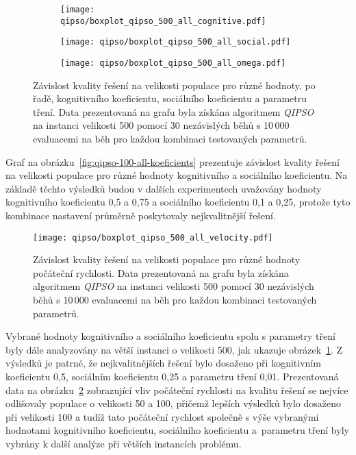 \begin{figure}[ht!]
    \centering
    \begin{subfigure}[b]{0.48\textwidth}
        \centering
        \texttt{[image: qipso/boxplot\_qipso\_500\_all\_cognitive.pdf]}
    \end{subfigure}
    \hfill
    \begin{subfigure}[b]{0.48\textwidth}
        \centering
        \texttt{[image: qipso/boxplot\_qipso\_500\_all\_social.pdf]}
    \end{subfigure}

    \begin{subfigure}[b]{0.48\textwidth}
        \centering
        \texttt{[image: qipso/boxplot\_qipso\_500\_all\_omega.pdf]}
    \end{subfigure}
    \caption{Závislost kvality řešení na velikosti populace pro různé hodnoty, po řadě, kognitivního koeficientu, sociálního koeficientu a parametru tření. Data prezentovaná na grafu byla získána algoritmem \emph{QIPSO} na instanci velikosti 500 pomocí 30 nezávislých běhů s 10\,000 evaluacemi na běh pro každou kombinaci testovaných parametrů.}
    \label{fig:qipso-500-koef}
\end{figure}

Graf na obrázku~\ref{fig:qipso-100-all-koeficients} prezentuje závislost kvality řešení na velikosti populace pro různé hodnoty kognitivního a sociálního koeficientu.  
Na základě těchto výsledků budou v dalších experimentech uvažovány hodnoty kognitivního koeficientu 0{,}5 a 0{,}75 a sociálního koeficientu 0{,}1 a 0{,}25, protože tyto kombinace nastavení průměrně poskytovaly nejkvalitnější řešení. 

\begin{figure}[ht!]
    \centering
    \texttt{[image: qipso/boxplot\_qipso\_500\_all\_velocity.pdf]}
    \caption{Závislost kvality řešení na velikosti populace pro různé hodnoty počáteční rychlosti. Data prezentovaná na grafu byla získána algoritmem \emph{QIPSO} na instanci velikosti 500 pomocí 30 nezávislých běhů s 10\,000 evaluacemi na běh pro každou kombinaci testovaných parametrů.}
    \label{fig:qipso-500-velocity}
\end{figure}

Vybrané hodnoty kognitivního a sociálního koeficientu spolu s parametry tření byly dále analyzovány na větší instanci o velikosti 500, jak ukazuje obrázek~\ref{fig:qipso-500-koef}.
Z výsledků je patrné, že nejkvalitnějších řešení bylo dosaženo při kognitivním koeficientu 0,5, sociálním koeficientu 0,25 a parametru tření 0,01.
Prezentovaná data na obrázku~\ref{fig:qipso-500-velocity} zobrazující vliv počáteční rychlosti na kvalitu řešení se nejvíce odlišovaly populace o velikosti 50 a 100, přičemž lepších výsledků bylo dosaženo při velikosti 100 a tudíž tato počáteční rychlost společně s výše vybranými hodnotami kognitivního koeficientu, sociálního koeficientu a~parametru tření byly vybrány k další analýze při větších instancích problému. 

